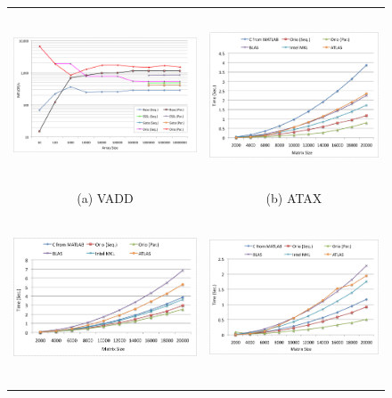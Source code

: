 \documentclass[runningheads]{llncs}
\begin{document}
\begin{figure}[htp]
{\small
\centering
\begin{tabular}{cc}

\begin{minipage}[b]{.5\textwidth}
\includegraphics[height=2in,width=\textwidth]{figures/vadd_bgp.png}
\end{minipage}
&
\begin{minipage}[b]{.5\textwidth}
\includegraphics[height=2in,width=\textwidth]{figures/atax.png}
\end{minipage}\\

(a) VADD & (b) ATAX \\

\begin{minipage}[b]{.5\textwidth}
\includegraphics[height=2in,width=\textwidth]{figures/gemver.png}
\end{minipage}
&
\begin{minipage}[b]{.5\textwidth}
\includegraphics[height=2in,width=\textwidth]{figures/bicgkernel.png}
\end{minipage}\\


\end{tabular}}
\end{figure}
\end{document}
